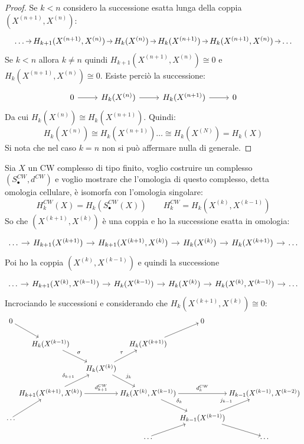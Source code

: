 \begin{proof}
    Se $ k < n $ considero la successione esatta lunga della coppia $ (X^{(n+1)}, X^{(n)}) $:
    \[
      \begin{tikzcd}[nodes={column sep=7pt, inner sep = 2 pt}]
        \dots \rar & H_{k+1}(X^{(n+1)}, X^{(n)}) \rar & H_k(X^{(n)}) \rar & H_k(X^{(n+1)}) \rar & H_{k}(X^{(n+1)}, X^{(n)}) \rar & \dots
      \end{tikzcd}
    \]
    Se $ k < n $ allora $ k \not = n $ quindi
    $ H_{k+1}(X^{(n+1)}, X^{(n)}) \cong 0 $ e
    $ H_k(X^{(n+1)}, X^{(n)}) \cong 0 $. Esiste perciò la successione:
    \[
      \begin{tikzcd}
       0\rar & H_k(X^{(n)}) \rar & H_k(X^{(n+1)}) \rar & 0
      \end{tikzcd}
    \]
    Da cui $ H_k(X^{(n)}) \cong H_k(X^{(n+1)}) $.
    Quindi:
    \[
      H_k(X^{(n)}) \cong H_k(X^{(n+1)}) \dots \cong H_k(X^{(N)}) = H_k(X)
    \]
    Si nota che nel caso $ k = n $ non si può affermare nulla di generale.
\end{proof}
\eproof
Sia $ X $ un CW complesso di tipo finito, voglio costruire un complesso $ (S_\bullet^{CW}, d^{CW}) $ e
voglio mostrare che l'omologia di questo complesso, detta omologia cellulare, è isomorfa con
l'omologia singolare:
\[
  H_k^{CW}(X) = H_k(S^{CW}_\bullet(X)) \qquad H_k^{CW} = H_k(X^{(k)}, X^{(k-1)})
\]
So che $ (X^{(k+1)}, X^{(k)}) $ è una coppia
e ho la successione esatta in omologia:
\[
  \begin{tikzcd}[nodes={column sep=10pt}]
    \dots \rar  & H_{k+1}(X^{(k+1)}) \rar & H_{k+1}(X^{(k+1)}, X^{(k)}) \rar & H_k(X^{(k)})   \rar & H_k(X^{(k+1)}) \rar & \dots
  \end{tikzcd}
\]
Poi ho la coppia $ (X^{(k)}, X^{(k-1)}) $ e quindi la successione
\[
  \begin{tikzcd}[nodes={column sep=10pt}]
    \dots \rar & H_{k+1}(X^{(k)}, X^{(k-1)}) \rar & H_k(X^{(k-1)}) \rar & H_k(X^{(k)}) \rar & H_{k}(X^{(k)}, X^{(k-1)}) \rar & \dots
  \end{tikzcd}
\]
Incrociando le successioni e considerando che $ H_k(X^{(k+1)}, X^{(k)}) \cong 0$:
\[
  \begin{tikzcd}[nodes={column sep=1pt, inner sep=2pt, outer sep=1pt}]
  0            \arrow{dr}{}      & {}                   & {}                                         & {}                           & 0  & {}\\
  {}                              & H_k(X^{(k-1)})   \arrow{dr}{\sigma}                 & {}                                    & H_k(X^{(k+1)})  \arrow{ur}{} & {} & {}\\
  {}                             & {}             & H_k(X^{(k)})   \arrow{dr}{j_k}   \arrow{ur}{\tau} & {}                           & {} & {}\\
  {}  & H_{k+1}(X^{(k+1)}, X^{(k)})  \arrow{ur}{\delta_{k+1}} \arrow{rr}{d_{k+1}^{CW}} & {}      & H_k(X^{(k)}, X^{(k-1)})  \arrow{rr}{d_{k}^{CW}}   \arrow{dr}{\delta_k}  & {} &  H_{k-1}(X^{(k-1)}, X^{(k-2)}) \\
  \dots \arrow{ur}{} & {} & {} & {} & H_{k-1}(X^{(k-1)}) \arrow{ur}{j_{k-1}} \arrow{dr}{} & {} \\
  {} & {} & {} & \dots \arrow{ur}{} & {} & \dots
\end{tikzcd}
\]
